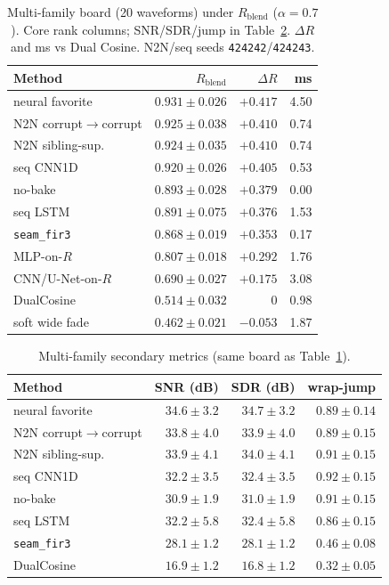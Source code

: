\begin{table}[htbp]
  \centering
  \caption{Multi-family board (20 waveforms) under $R_{\mathrm{blend}}$ ($\alpha{=}0.7$).
  Core rank columns; SNR/SDR/jump in Table~\ref{tab:sota-main-metrics}.
  $\Delta R$ and ms vs Dual Cosine. N2N/seq seeds \texttt{424242}/\texttt{424243}.}
  \label{tab:sota-main}
  \setlength{\tabcolsep}{3pt}
  \footnotesize
  \begin{tabular}{@{}lrrr@{}}
    \toprule
    Method & $R_{\mathrm{blend}}$ & $\Delta R$ & ms \\
    \midrule
    neural favorite & $0.931\pm0.026$ & ${+}0.417$ & 4.50 \\
    N2N corrupt$\to$corrupt & $0.925\pm0.038$ & ${+}0.410$ & 0.74 \\
    N2N sibling-sup. & $0.924\pm0.035$ & ${+}0.410$ & 0.74 \\
    seq CNN1D & $0.920\pm0.026$ & ${+}0.405$ & 0.53 \\
    no-bake & $0.893\pm0.028$ & ${+}0.379$ & 0.00 \\
    seq LSTM & $0.891\pm0.075$ & ${+}0.376$ & 1.53 \\
    \texttt{seam\_fir3} & $0.868\pm0.019$ & ${+}0.353$ & 0.17 \\
    MLP-on-$R$ & $0.807\pm0.018$ & ${+}0.292$ & 1.76 \\
    CNN/U-Net-on-$R$ & $0.690\pm0.027$ & ${+}0.175$ & 3.08 \\
    DualCosine & $0.514\pm0.032$ & $0$ & 0.98 \\
    soft wide fade & $0.462\pm0.021$ & ${-}0.053$ & 1.87 \\
    \bottomrule
  \end{tabular}
\end{table}
\FloatBarrier

\begin{table}[htbp]
  \centering
  \caption{Multi-family secondary metrics (same board as Table~\ref{tab:sota-main}).}
  \label{tab:sota-main-metrics}
  \setlength{\tabcolsep}{3pt}
  \footnotesize
  \begin{tabular}{@{}lrrr@{}}
    \toprule
    Method & SNR (dB) & SDR (dB) & wrap-jump \\
    \midrule
    neural favorite & $34.6\pm3.2$ & $34.7\pm3.2$ & $0.89\pm0.14$ \\
    N2N corrupt$\to$corrupt & $33.8\pm4.0$ & $33.9\pm4.0$ & $0.89\pm0.15$ \\
    N2N sibling-sup. & $33.9\pm4.1$ & $34.0\pm4.1$ & $0.91\pm0.15$ \\
    seq CNN1D & $32.2\pm3.5$ & $32.4\pm3.5$ & $0.92\pm0.15$ \\
    no-bake & $30.9\pm1.9$ & $31.0\pm1.9$ & $0.91\pm0.15$ \\
    seq LSTM & $32.2\pm5.8$ & $32.4\pm5.8$ & $0.86\pm0.15$ \\
    \texttt{seam\_fir3} & $28.1\pm1.2$ & $28.1\pm1.2$ & $0.46\pm0.08$ \\
    DualCosine & $16.9\pm1.2$ & $16.8\pm1.2$ & $0.32\pm0.05$ \\
    \bottomrule
  \end{tabular}
\end{table}
\FloatBarrier




